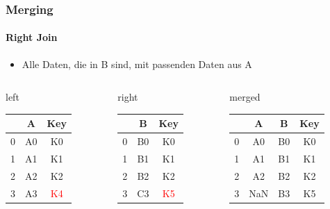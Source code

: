 \documentclass[12pt,ngerman]{beamer}
\def\firstcircle{(0,0) circle (2cm)}
\def\secondcircle{(0:3cm) circle (2cm)}
\begin{document}
\begin{frame}
\frametitle{Merging}
\framesubtitle{Right Join}

\begin{itemize}
\item Alle Daten, die in B sind, mit passenden Daten aus A
\end{itemize}

\begin{center}

\end{center}

{\footnotesize
\begin{columns}
\begin{column}{0.3\textwidth}
left \\
\begin{tabular}{c|cc} \toprule
   & A  &  Key \\ \midrule
0 & A0 &  K0 \\
1 & A1 &  K1 \\ 
2 & A2 &  K2 \\
3 & A3 &  \textcolor{red}{K4} \\ \bottomrule
\end{tabular}
\end{column}
\begin{column}{0.3\textwidth}
right \\
\begin{tabular}{c|cc} \toprule
   &  B   & Key \\ \midrule
0 &  B0 & K0 \\
1 &  B1 & K1 \\ 
2 &  B2 & K2 \\
3 &  C3 & \textcolor{red}{K5} \\ \bottomrule
\end{tabular}\end{column}
\begin{column}{0.3\textwidth}
merged \\
\begin{tabular}{c|ccc} \toprule
   & A  & B   & Key \\ \midrule
0 & A0 & B0 & K0 \\
1 & A1 & B1 & K1 \\ 
2 & A2 & B2 & K2 \\ 
3 & NaN & B3 & K5 \\ \bottomrule
\end{tabular} \\
\vspace*{0.4em}
\end{column}
\end{columns}}

\end{frame}
\end{document}

